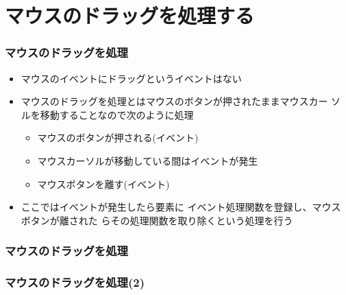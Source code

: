 \section{マウスのドラッグを処理する}
\begin{frame}[containsverbatim]
 \frametitle{マウスのドラッグを処理}
\begin{itemize}
 \item マウスのイベントにドラッグというイベントはない
 \item マウスのドラッグを処理とはマウスのボタンが押されたままマウスカー
       ソルを移動することなので次のように処理
\begin{itemize}
 \item マウスのボタンが押される(イベント)
 \item マウスカーソルが移動している間はイベントが発生
 \item マウスボタンを離す(イベント)
\end{itemize}
 \item ここではイベントが発生したら要素に
       イベント処理関数を登録し、マウスボタンが離された
       らその処理関数を取り除くという処理を行う
\end{itemize}
\end{frame}
\begin{frame}[containsverbatim]
 \frametitle{マウスのドラッグを処理}
\end{frame}
\begin{frame}[containsverbatim]
 \frametitle{マウスのドラッグを処理(2)}
\end{frame}
